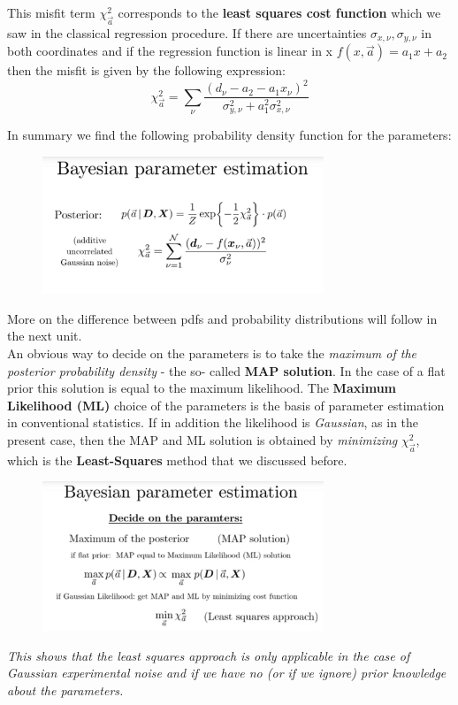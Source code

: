 \documentclass[12pt, a4paper]{scrartcl}
\begin{document}
This misfit term $\chi_{\vec{a}}^2$ corresponds to the \textbf{least squares cost function} which we
saw in the classical regression procedure. 
If there are uncertainties $\sigma_{x,\nu}, \sigma_{y,\nu}$ in both coordinates and if the regression
function is linear in x $f(x,\vec{a})=a_1x+a_2$ then the misfit is given by the following expression:
\[\chi_{\vec{a}}^2=\sum_{\nu}\frac{(d_{\nu}-a_2-a_1x_{\nu})^2}{\sigma_{y,\nu}^2+a_1^2\sigma_{x,\nu}^2}\]

In summary we find the following probability density function for the parameters:
\begin{figure}[H]
	\centering
	\includegraphics[width=0.75\textwidth]{7_4.png}
\end{figure}
More on the difference between pdfs and probability distributions will follow in the next unit.\\

An obvious way to decide on the parameters is to take the \textit{maximum of the posterior probability density} - the so-
called \textbf{MAP solution}. In the case of a flat prior this solution is
equal to the maximum likelihood. The\textbf{ Maximum Likelihood (ML)} choice of
the parameters is the basis of parameter estimation in conventional statistics.
If in addition the likelihood is \textit{Gaussian}, as in the present case, then the
MAP and ML solution is obtained by \textit{minimizing} $\chi_{\vec{a}}^2$, which is the
\textbf{Least-Squares} method that we discussed before.\\%
\begin{figure}[H]
	\centering
	\includegraphics[width=0.75\textwidth]{7_5.png}
\end{figure}
\textit{This shows that the least squares approach is \textit{only applicable} in the case of Gaussian 
experimental noise and if we have no (or if we ignore) prior knowledge about the parameters.} \\
\end{document}
